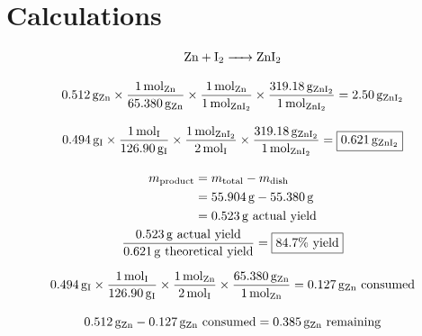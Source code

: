 \documentclass[titlepage]{article}
\begin{document}
\section{Calculations}
\begin{gather*}
    \ce{Zn + I2 -> ZnI2} \\[2ex]
    \qty{0.512}{\gram\of{Zn}}\times\frac{\qty{1}{\mol\of{Zn}}}{\qty{65.380}{\gram\of{Zn}}}\times\frac{\qty{1}{\mol\of{Zn}}}{\qty{1}{\mol\of{\ce{ZnI2}}}}\times\frac{\qty{319.18}{\gram\of{\ce{ZnI2}}}}{\qty{1}{\mol\of{\ce{ZnI2}}}}=\qty{2.50}{\gram\of{\ce{ZnI2}}} \\[2ex]
    \qty{0.494}{\gram\of{I}}\times\frac{\qty{1}{\mol\of{I}}}{\qty{126.90}{\gram\of{I}}}\times\frac{\qty{1}{\mol\of{\ce{ZnI2}}}}{\qty{2}{\mol\of{I}}}\times\frac{\qty{319.18}{\gram\of{\ce{ZnI2}}}}{\qty{1}{\mol\of{\ce{ZnI2}}}}=\boxed{\qty{0.621}{\gram\of{\ce{ZnI2}}}} \\[2ex]
    \begin{split}
    m_{\text{product}} &= m_{\text{total}} - m_{\text{dish}} \\
                       &= \qty{55.904}{\gram} - \qty{55.380}{\gram} \\
                       &= \qty{0.523}{\gram} \text{ actual yield} \\
    \end{split} \\
    \frac{\qty{0.523}{\gram}\mathrm{\ actual\ yield}}{\qty{0.621}{\gram}\mathrm{\ theoretical\ yield}}=\boxed{84.7\unit{\percent}\mathrm{\ yield}}
\end{gather*}

\begin{gather*}
    \qty{0.494}{\gram\of{I}}\times\frac{\qty{1}{\mol\of{I}}}{\qty{126.90}{\gram\of{I}}}\times\frac{\qty{1}{\mol\of{Zn}}}{\qty{2}{\mol\of{I}}}\times\frac{\qty{65.380}{\gram\of{Zn}}}{\qty{1}{\mol\of{Zn}}}=\qty{0.127}{\gram\of{Zn}}\mathrm{\ consumed} \\[2ex]
    \qty{0.512}{\gram\of{Zn}}-\qty{0.127}{\gram\of{Zn}}\mathrm{\ consumed}=\qty{0.385}{\gram\of{Zn}}\mathrm{\ remaining}
\end{gather*}
\end{document}

